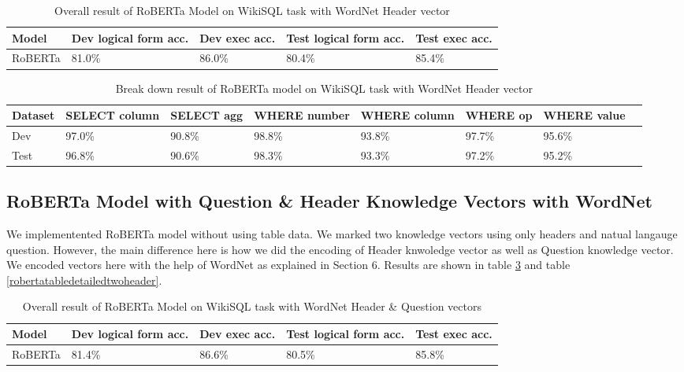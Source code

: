 \documentclass[12pt]{article}
\begin{document}
 \begin{table}
\centering
 \begin{tabular}{| m{2cm} | m{2cm}| m{2cm} |m{2cm}| m{2cm} |} 
 \hline
Model & Dev logical form acc. & Dev exec acc. & Test logical form acc. & Test exec acc. \\ 
 \hline\hline
  RoBERTa & 81.0\% & 86.0\% & 80.4\% & 85.4\% \\ 
 \hline
\end{tabular}
\caption{Overall result of RoBERTa Model on WikiSQL task with WordNet Header vector}
\label{robertatableoneheader}
\end{table}


\begin{table}
\centering
 \begin{tabular}{| m{2cm} | m{2cm}| m{2cm} |m{2cm}| m{2cm} |m{2cm} | m{2cm} |m{2cm} |} 
 \hline
  Dataset & SELECT column & SELECT agg & WHERE number & WHERE column & WHERE op & WHERE value\\ 
 \hline\hline
  Dev & 97.0\% & 90.8\% & 98.8\% & 93.8\% & 97.7\% &  95.6\% \\ 
\hline
 Test & 96.8\% & 90.6\% & 98.3\% & 93.3\% & 97.2\% &  95.2\% \\ 
 \hline

\end{tabular}
\caption{Break down result of RoBERTa model on WikiSQL task with WordNet Header vector}
\label{robertatabledetailedoneheader}
\end{table}


\subsection{RoBERTa Model with Question \& Header Knowledge Vectors with WordNet}

We implementented RoBERTa model without using table data. We marked two knowledge vectors using only headers and natual langauge question. However, the main difference here is how we did the  encoding of Header knwoledge vector as well as Question knowledge vector. We encoded vectors here with the help of WordNet as explained in Section 6. Results are shown in table \ref{robertatabletwoheader} and table \ref{robertatabledetailedtwoheader}.

 \begin{table}
\centering
 \begin{tabular}{| m{2cm} | m{2cm}| m{2cm} |m{2cm}| m{2cm} |} 
 \hline
Model & Dev logical form acc. & Dev exec acc. & Test logical form acc. & Test exec acc. \\ 
 \hline\hline
  RoBERTa & 81.4\% & 86.6\% & 80.5\% & 85.8\% \\ 
 \hline
\end{tabular}
\caption{Overall result of RoBERTa Model on WikiSQL task with WordNet Header \& Question vectors}
\label{robertatabletwoheader}
\end{table}
\end{document}
